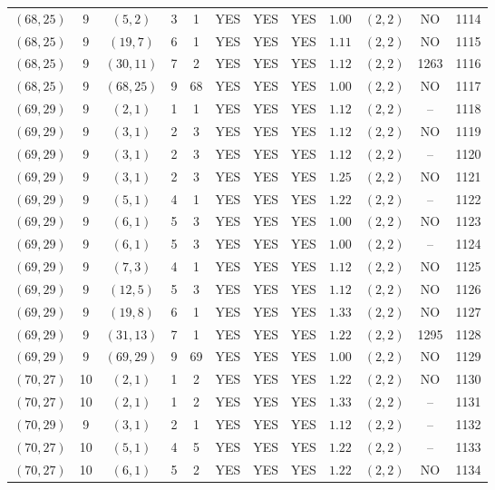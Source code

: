 \begin{longtable}{|c|c|c|c|c|c|c|c|c|c|c|c|}
$(68,25)$ & 9 & $(5,2)$ & 3 & 1 & YES & YES & YES & $1.00$ & $(2,2)$ & NO & 1114\\
$(68,25)$ & 9 & $(19,7)$ & 6 & 1 & YES & YES & YES & $1.11$ & $(2,2)$ & NO & 1115\\
$(68,25)$ & 9 & $(30,11)$ & 7 & 2 & YES & YES & YES & $1.12$ & $(2,2)$ & 1263 & 1116\\
$(68,25)$ & 9 & $(68,25)$ & 9 & 68 & YES & YES & YES & $1.00$ & $(2,2)$ & NO & 1117\\
$(69,29)$ & 9 & $(2,1)$ & 1 & 1 & YES & YES & YES & $1.12$ & $(2,2)$ & -- & 1118\\
$(69,29)$ & 9 & $(3,1)$ & 2 & 3 & YES & YES & YES & $1.12$ & $(2,2)$ & NO & 1119\\
$(69,29)$ & 9 & $(3,1)$ & 2 & 3 & YES & YES & YES & $1.12$ & $(2,2)$ & -- & 1120\\
$(69,29)$ & 9 & $(3,1)$ & 2 & 3 & YES & YES & YES & $1.25$ & $(2,2)$ & NO & 1121\\
$(69,29)$ & 9 & $(5,1)$ & 4 & 1 & YES & YES & YES & $1.22$ & $(2,2)$ & -- & 1122\\
$(69,29)$ & 9 & $(6,1)$ & 5 & 3 & YES & YES & YES & $1.00$ & $(2,2)$ & NO & 1123\\
$(69,29)$ & 9 & $(6,1)$ & 5 & 3 & YES & YES & YES & $1.00$ & $(2,2)$ & -- & 1124\\
$(69,29)$ & 9 & $(7,3)$ & 4 & 1 & YES & YES & YES & $1.12$ & $(2,2)$ & NO & 1125\\
$(69,29)$ & 9 & $(12,5)$ & 5 & 3 & YES & YES & YES & $1.12$ & $(2,2)$ & NO & 1126\\
$(69,29)$ & 9 & $(19,8)$ & 6 & 1 & YES & YES & YES & $1.33$ & $(2,2)$ & NO & 1127\\
$(69,29)$ & 9 & $(31,13)$ & 7 & 1 & YES & YES & YES & $1.22$ & $(2,2)$ & 1295 & 1128\\
$(69,29)$ & 9 & $(69,29)$ & 9 & 69 & YES & YES & YES & $1.00$ & $(2,2)$ & NO & 1129\\
$(70,27)$ & 10 & $(2,1)$ & 1 & 2 & YES & YES & YES & $1.22$ & $(2,2)$ & NO & 1130\\
$(70,27)$ & 10 & $(2,1)$ & 1 & 2 & YES & YES & YES & $1.33$ & $(2,2)$ & -- & 1131\\
$(70,29)$ & 9 & $(3,1)$ & 2 & 1 & YES & YES & YES & $1.12$ & $(2,2)$ & -- & 1132\\
$(70,27)$ & 10 & $(5,1)$ & 4 & 5 & YES & YES & YES & $1.22$ & $(2,2)$ & -- & 1133\\
$(70,27)$ & 10 & $(6,1)$ & 5 & 2 & YES & YES & YES & $1.22$ & $(2,2)$ & NO & 1134\\

\end{longtable}
